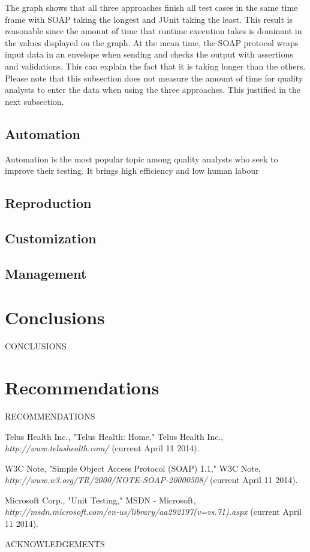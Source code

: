 \documentclass[12pt]{article}
\begin{document}
The graph shows that all three approaches finish all test cases in the same time frame with SOAP taking the longest and JUnit taking the least. This result is reasonable since the amount of time that runtime execution takes is dominant in the values displayed on the graph. At the mean time, the SOAP protocol wraps input data in an envelope when sending and checks the output with assertions and validations. This can explain the fact that it is taking longer than the others. Please note that this subsection does not measure the amount of time for quality analysts to enter the data when using the three approaches. This justified in the next subsection. \\


\subsection{Automation}
Automation is the most popular topic among quality analysts who seek to improve their testing. It brings high efficiency and low human labour

\subsection{Reproduction}
\subsection{Customization}
\subsection{Management}


\section{Conclusions}
CONCLUSIONS


\section{Recommendations}
RECOMMENDATIONS


\newpage



\begin{thebibliography}{1}

   Telus Health Inc., "Telus Health: Home," Telus Health Inc., {\em http://www.telushealth.com/} (current April 11 2014).

   W3C Note, "Simple Object Access Protocol (SOAP) 1.1," W3C Note, {\em http://www.w3.org/TR/2000/NOTE-SOAP-20000508/} (current April 11 2014).

 Microsoft Corp., "Unit Testing," MSDN - Microsoft, {\em http://msdn.microsoft.com/en-us/library/aa292197(v=vs.71).aspx} (current April 11 2014).

\end{thebibliography}
\newpage


ACKNOWLEDGEMENTS
\newpage


\end{document}
